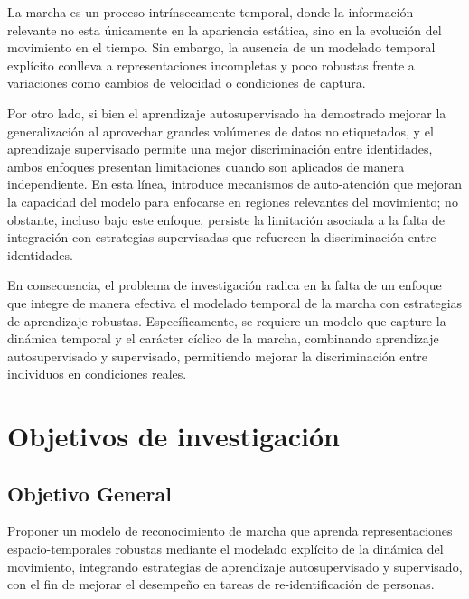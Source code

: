 La marcha es un proceso intrínsecamente temporal, donde la información relevante no esta únicamente en la apariencia estática, sino en la evolución del movimiento en el tiempo. Sin embargo, la ausencia de un modelado temporal explícito conlleva a representaciones incompletas y poco robustas frente a variaciones como cambios de velocidad o condiciones de captura.

Por otro lado, si bien el aprendizaje autosupervisado ha demostrado mejorar la generalización al aprovechar grandes volúmenes de datos no etiquetados, y el aprendizaje supervisado permite una mejor discriminación entre identidades, ambos enfoques presentan limitaciones cuando son aplicados de manera independiente. En esta línea, \citet{Kovacevic2021SelfAttentionGait} introduce mecanismos de auto-atención que mejoran la capacidad del modelo para enfocarse en regiones relevantes del movimiento; no obstante, incluso bajo este enfoque, persiste la limitación asociada a la falta de integración con estrategias supervisadas que refuercen la discriminación entre identidades.

En consecuencia, el problema de investigación radica en la falta de un enfoque que integre de manera efectiva el modelado temporal de la marcha con estrategias de aprendizaje robustas. Específicamente, se requiere un modelo que capture la dinámica temporal y el carácter cíclico de la marcha, combinando aprendizaje autosupervisado y supervisado, permitiendo mejorar la discriminación entre individuos en condiciones reales. 

\section{Objetivos de investigación}

\subsection*{Objetivo General}

Proponer un modelo de reconocimiento de marcha que aprenda representaciones espacio-temporales robustas mediante el modelado explícito de la dinámica del movimiento, integrando estrategias de aprendizaje autosupervisado y supervisado, con el fin de mejorar el desempeño en tareas de re-identificación de personas.

